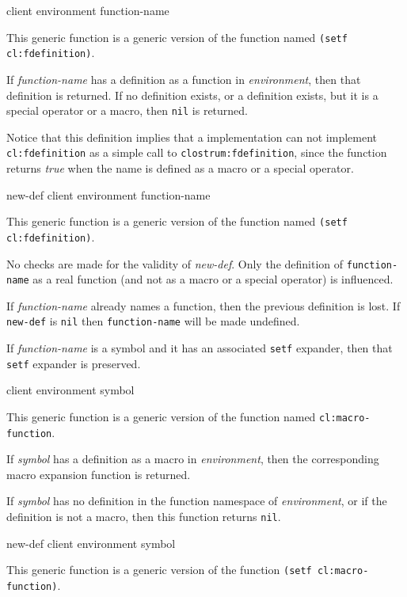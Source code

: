  {client environment function-name}

This generic function is a generic version of the \commonlisp{}
function named \texttt{(setf cl:fdefinition)}.

If \textit{function-name} has a definition as a function in
\textit{environment}, then that definition is returned.  If no
definition exists, or a definition exists, but it is a special
operator or a macro, then \texttt{nil} is returned.

Notice that this definition implies that a \commonlisp{}
implementation can not implement \texttt{cl:fdefinition} as a simple call
to \texttt{clostrum:fdefinition}, since the \commonlisp{} function
returns \textit{true} when the name is defined as a macro or a special
operator.

 {new-def client environment function-name}

This generic function is a generic version of the \commonlisp{}
function named \texttt{(setf cl:fdefinition)}.

No checks are made for the validity of \textit{new-def}.  Only the
definition of \texttt{function-name} as a real function (and not as a
macro or a special operator) is influenced. 

If \textit{function-name} already names a function, then the previous
definition is lost.  If \texttt{new-def} is \texttt{nil} then
\texttt{function-name} will be made undefined.

If \textit{function-name} is a symbol and it has an associated
\texttt{setf} expander, then that \texttt{setf} expander is preserved.

 {client environment symbol}

This generic function is a generic version of the \commonlisp{}
function named \texttt{cl:macro-function}.

If \textit{symbol} has a definition as a macro in
\textit{environment}, then the corresponding macro expansion function
is returned.

If \textit{symbol} has no definition in the function namespace of
\textit{environment}, or if the definition is not a macro, then this
function returns \texttt{nil}.

 {new-def client environment symbol}

This generic function is a generic version of the \commonlisp{}
function \texttt{(setf cl:macro-function)}.

